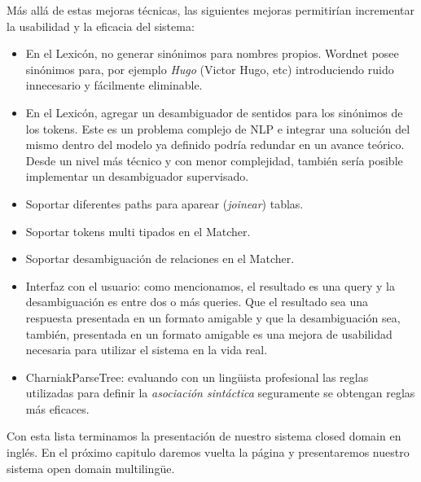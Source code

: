 Más allá de estas mejoras técnicas, las siguientes mejoras permitirían incrementar la usabilidad y la eficacia del sistema:

\begin{itemize}
\item En el Lexicón, no generar sinónimos para nombres propios. Wordnet posee sinónimos para, por ejemplo \textit{Hugo} (Victor Hugo, etc) introduciendo ruido innecesario y fácilmente eliminable.
\item En el Lexicón, agregar un desambiguador de sentidos para los sinónimos de los tokens. Este es un problema complejo de NLP e integrar una solución del mismo dentro del modelo ya definido podría redundar en un avance teórico. Desde un nivel más técnico y con menor complejidad, también sería posible implementar un desambiguador supervisado.
\item Soportar diferentes paths para aparear (\textit{joinear}) tablas.
\item Soportar tokens multi tipados en el Matcher.
\item Soportar desambiguación de relaciones en el Matcher.
\item Interfaz con el usuario: como mencionamos, el resultado es una query y la desambiguación es entre dos o más queries. Que el resultado sea una respuesta presentada en un formato amigable y que la desambiguación sea, también, presentada en un formato amigable es una mejora de usabilidad necesaria para utilizar el sistema en la vida real.
\item CharniakParseTree: evaluando con un lingüista profesional las reglas utilizadas para definir la \textit{asociación sintáctica} seguramente se obtengan reglas más eficaces.

\end{itemize}

Con esta lista terminamos la presentación de nuestro sistema closed domain en inglés. En el próximo capitulo daremos vuelta la página y presentaremos nuestro sistema open domain multilingüe.
